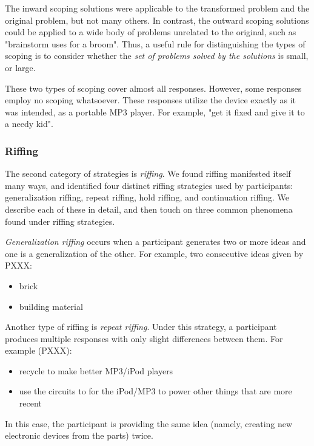 The inward scoping solutions were applicable to the transformed problem and the original problem, but not many others. In contrast, the outward scoping solutions could be applied to a wide body of problems unrelated to the original, such as "brainstorm uses for a broom". Thus, a useful rule for distinguishing the types of scoping is to consider whether the \emph{set of problems solved by the solutions} is small, or large.

These two types of scoping cover almost all responses. However, some responses employ no scoping whatsoever. These responses utilize the device exactly as it was intended, as a portable MP3 player. For example, "get it fixed and give it to a needy kid".

\subsubsection{Riffing}

The second category of strategies is \emph{riffing}.
We found riffing manifested itself many ways, and identified four distinct riffing strategies used by participants: generalization riffing, repeat riffing, hold riffing, and continuation riffing. We describe each of these in detail, and then touch on three common phenomena found under riffing strategies.

\emph{Generalization riffing} occurs when a participant generates two or more ideas and one is a generalization of the other. For example, two consecutive ideas given by PXXX:

\begin{itemize}
    \item brick
    \item building material
\end{itemize}

Another type of riffing is \emph{repeat riffing}. Under this strategy, a participant produces multiple responses with only slight differences between them. For example (PXXX):

\begin{itemize}
    \item recycle to make better MP3/iPod players
    \item use the circuits to for the iPod/MP3 to power other things that are more recent
\end{itemize}

In this case, the participant is providing the same idea (namely, creating new electronic devices from the parts) twice.

